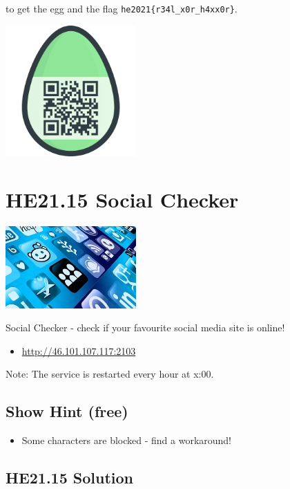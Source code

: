 \documentclass[english,a4paper,nols,noindent]{tufte-handout}
\begin{document}
\noindent to get the egg and the flag
\verb+he2021{r34l_x0r_h4xx0r}+.
\begin{marginfigure}
    \includegraphics[width=50mm]{ch14/output.png}
\end{marginfigure}

\hypertarget{he21.15}{%
  \section{HE21.15 Social Checker}
  \label{he21.15}}
\begin{marginfigure}
    \includegraphics[width=50mm]{images/challenge15.jpg}
\end{marginfigure}

\noindent Social Checker - check if your favourite social media site is online!

\begin{itemize}
\item \url{http://46.101.107.117:2103}
\end{itemize}
Note: The service is restarted every hour at x:00.

\subsection{Show Hint (free)}
\begin{itemize}
\item Some characters are blocked - find a workaround!
\end{itemize}


\hypertarget{he21.15-solution}{%
\subsection{HE21.15 Solution}\label{he21.15-solution}}
\end{document}
